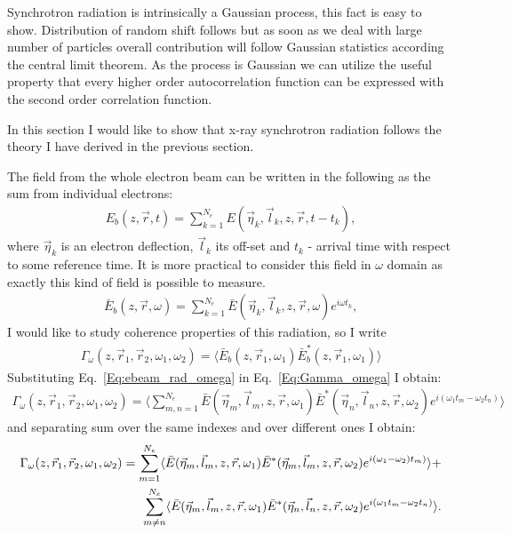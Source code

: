     Synchrotron radiation is intrinsically a Gaussian process, this fact is easy to show. Distribution of random shift follows  but as soon as we deal with large number of particles overall contribution will follow Gaussian statistics according the central limit theorem. As the process is Gaussian we can utilize the useful property that every higher order autocorrelation function can be expressed with the second order correlation function.

    In this section I would like to show that x-ray synchrotron radiation follows the theory I have derived in the previous section.
    
    The field from the whole electron beam can be written in the following as the sum from individual electrons:
    \begin{align}
        E_b(z, \vec{r}, t) = \sum_{k=1}^{N_e} E(\vec{\eta}_k, \vec{l}_k, z, \vec{r}, t - t_k), 
    \end{align}
    where $\vec{\eta}_k$ is an electron deflection, $\vec{l}_k$ its off-set and $t_k$ - arrival time with respect to some reference time. It is more practical to consider this field in $\omega$ domain as exactly this kind of field is possible to measure. 
    \begin{align}
        \bar{E}_b(z, \vec{r}, \omega) = \sum_{k=1}^{N_e} \bar{E}(\vec{\eta}_k, \vec{l}_k, z, \vec{r}, \omega)e^{i \omega t_k}, 
        \label{Eq:ebeam_rad_omega}
    \end{align}   
    I would like to study coherence properties of this radiation, so I write 
    \begin{align}
        \Gamma_\omega (z, \vec{r}_1, \vec{r}_2, \omega_1, \omega_2) = \langle \bar{E}_b(z, \vec{r}_1, \omega_1) \bar{E}^*_b(z, \vec{r}_1, \omega_1) \rangle
        \label{Eq:Gamma_omega}
    \end{align} 
    Substituting Eq.~\ref{Eq:ebeam_rad_omega} in Eq.~\ref{Eq:Gamma_omega} I obtain:
    \begin{align}
        \Gamma_\omega (z, \vec{r}_1, \vec{r}_2, \omega_1, \omega_2) = \bigg\langle 
        \sum_{m,n=1}^{N_e} \bar{E}(\vec{\eta}_m, \vec{l}_m, z, \vec{r}, \omega_1)\bar{E}^*(\vec{\eta}_n, \vec{l}_n, z, \vec{r}, \omega_2)e^{i (\omega_1 t_m - \omega_2 t_n)}
        \bigg\rangle
    \end{align}
    and separating sum over the same indexes and over different ones I obtain:
    \begin{align}
        \Gamma_\omega (z, \vec{r}_1, \vec{r}_2, \omega_1, \omega_2) =  
        \sum_{m = 1}^{N_e} \langle\bar{E}(\vec{\eta}_m, \vec{l}_m, z, \vec{r}, \omega_1)\bar{E}^*(\vec{\eta}_m, \vec{l}_m, z, \vec{r}, \omega_2)e^{i (\omega_1 -\omega_2) t_m)}\rangle + \cr
        \sum_{m \neq n}^{N_e} \langle\bar{E}(\vec{\eta}_m, \vec{l}_m, z, \vec{r}, \omega_1)\bar{E}^*(\vec{\eta}_n, \vec{l}_n, z, \vec{r}, \omega_2)e^{i (\omega_1 t_m - \omega_2 t_n)}\rangle.
        \label{Eq:Two_sums}
    \end{align}
